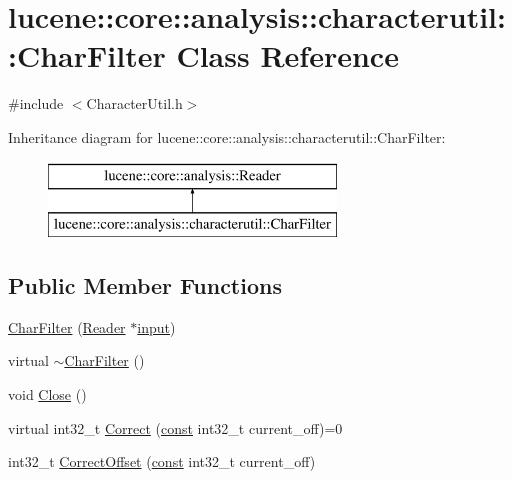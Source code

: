 \hypertarget{classlucene_1_1core_1_1analysis_1_1characterutil_1_1CharFilter}{}\section{lucene\+:\+:core\+:\+:analysis\+:\+:characterutil\+:\+:Char\+Filter Class Reference}
\label{classlucene_1_1core_1_1analysis_1_1characterutil_1_1CharFilter}


{\ttfamily \#include $<$Character\+Util.\+h$>$}

Inheritance diagram for lucene\+:\+:core\+:\+:analysis\+:\+:characterutil\+:\+:Char\+Filter\+:\begin{figure}[H]
\begin{center}
\leavevmode
\includegraphics[height=2.000000cm]{classlucene_1_1core_1_1analysis_1_1characterutil_1_1CharFilter}
\end{center}
\end{figure}
\subsection*{Public Member Functions}
\begin{DoxyCompactItemize}
\item 
\mbox{\hyperlink{classlucene_1_1core_1_1analysis_1_1characterutil_1_1CharFilter_ac13b7526b15e97a551071c2b759d1af1}{Char\+Filter}} (\mbox{\hyperlink{classlucene_1_1core_1_1analysis_1_1Reader}{Reader}} $\ast$\mbox{\hyperlink{classlucene_1_1core_1_1analysis_1_1characterutil_1_1CharFilter_a774b34856b115721d2ec012e475413c4}{input}})
\item 
virtual \mbox{\hyperlink{classlucene_1_1core_1_1analysis_1_1characterutil_1_1CharFilter_acf60f32d245a97caebc76508363d61b6}{$\sim$\+Char\+Filter}} ()
\item 
void \mbox{\hyperlink{classlucene_1_1core_1_1analysis_1_1characterutil_1_1CharFilter_a47ff3dc61979b80927ed5779cb55bd09}{Close}} ()
\item 
virtual int32\+\_\+t \mbox{\hyperlink{classlucene_1_1core_1_1analysis_1_1characterutil_1_1CharFilter_ad1be13a08cf750862795cb9b29ed4e09}{Correct}} (\mbox{\hyperlink{ZlibCrc32_8h_a2c212835823e3c54a8ab6d95c652660e}{const}} int32\+\_\+t current\+\_\+off)=0
\item 
int32\+\_\+t \mbox{\hyperlink{classlucene_1_1core_1_1analysis_1_1characterutil_1_1CharFilter_a6e4becb7161f99dec056ef207fda3f23}{Correct\+Offset}} (\mbox{\hyperlink{ZlibCrc32_8h_a2c212835823e3c54a8ab6d95c652660e}{const}} int32\+\_\+t current\+\_\+off)
\end{DoxyCompactItemize}
